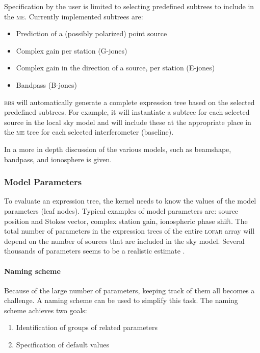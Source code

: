 \documentclass[10pt]{lofar}
\newcommand{\bbs}{\textsc{bbs}\xspace}
\newcommand{\lofar}{\textsc{lofar}\xspace}
\newcommand{\me}{\textsc{me}\xspace}
\begin{document}
Specification by the user is limited to selecting predefined subtrees to include
in the \me. Currently implemented subtrees are:
\begin{itemize}
\item Prediction of a (possibly polarized) point source
\item Complex gain per station (G-jones)
\item Complex gain in the direction of a source, per station (E-jones)
\item Bandpass (B-jones)
\end{itemize}

\bbs will automatically generate a complete expression tree based on the
selected predefined subtrees. For example, it will instantiate a subtree for
each selected source in the local sky model and will include these at the
appropriate place in the \me tree for each selected interferometer (baseline).

In \cite[sec. 2]{LOFAR-ASTRON-SDD-050} a more in depth discussion of the various
models, such as beamshape, bandpass, and ionosphere is given. 

\subsubsection{Model Parameters}
To evaluate an expression tree, the kernel needs to know the values of
the model parameters (leaf nodes). Typical examples of model parameters are:
source position and Stokes vector, complex station gain, ionospheric phase
shift. The total number of parameters in the expression trees of the entire
\lofar array will depend on the number of sources that are included in the sky
model. Several thousands of parameters seems to be a realistic estimate
\cite{LOFAR-ASTRON-SDD-052}.

\paragraph{Naming scheme}
Because of the large number of parameters, keeping track of them all becomes a
challenge. A naming scheme can be used to simplify this task. The naming scheme
achieves two goals:
\begin{enumerate}
\item Identification of groups of related parameters
\item Specification of default values
\end{enumerate}
\end{document}
